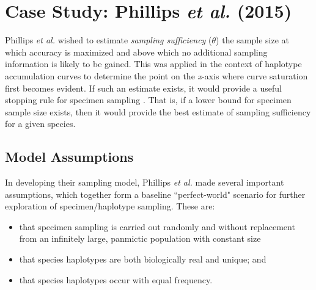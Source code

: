 \section{Case Study: Phillips \textit{et al.} (2015)}

Phillips \textit{et al.} \cite{phillips2015exploration} wished to estimate \textit{sampling sufficiency} ($\theta$) \textemdash \hspace{1mm} the sample size at which accuracy is maximized and above which no additional sampling information is likely to be gained. This was applied in the context of haplotype accumulation curves to determine the point on the \textit{x}-axis where curve saturation first becomes evident. If such an estimate exists, it would provide a useful stopping rule for specimen sampling \cite{phillips2015exploration}. That is, if a lower bound for specimen sample size exists, then it would provide the best estimate of sampling sufficiency for a given species.



\subsection{Model Assumptions}

In developing their sampling model, Phillips \textit{et al.} \cite{phillips2015exploration} made several important \\ assumptions, which together form a baseline ``perfect-world" scenario for further \\ exploration of specimen/haplotype sampling. These are:

\begin{itemize}

\item that specimen sampling is carried out randomly and without replacement from an infinitely large, panmictic population with constant size

\vspace{1mm}

\item that species haplotypes are both biologically real and unique; and

\vspace{1mm}

\item that species haplotypes occur with equal frequency.

\end{itemize}



